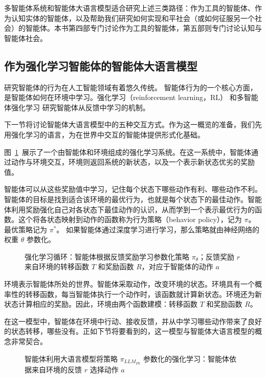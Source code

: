 多智能体系统和智能体大语言模型适合研究上述三类路径：作为工具的智能体、作为认知实体的智能体，以及帮助我们研究如何实现和平社会（或如何征服另一个社会）的智能体。本书第四部专门讨论作为工具的智能体，第五部则专门讨论认知与智能体社会。

\subsection{作为强化学习智能体的智能体大语言模型}
研究智能体的行为在人工智能领域有着悠久传统。
智能体行为的一个核心方面，是智能体如何在环境中学习。强化学习（reinforcement learning，RL）\citep{sutton2018reinforcement} 和多智能体强化学习 \citep{wong2021multiagent} 研究智能体从反馈中学习的机制。

下一节将讨论智能体大语言模型中的五种交互方式。作为这一概览的准备，我们先用强化学习的语言，为在世界中交互的智能体提供形式化基础。




图~\ref{fig:rl}~展示了一个由智能体和环境组成的强化学习系统。在这一系统中，智能体通过动作与环境交互，环境则返回系统的新状态，以及一个表示新状态优劣的奖励值。

智能体可以从这些奖励值中学习，记住每个状态下哪些动作有利、哪些动作不利。智能体的目标是找到适合该环境的最优行为，也就是每个状态下的最佳动作。智能体利用奖励强化自己对各状态下最佳动作的认识，从而学到一个表示最优行为的函数。这个将各状态映射到动作的函数称为行为策略（behavior policy），记为 $\pi$。最优策略记为 $\pi^*$。
如果智能体通过深度学习进行学习，那么策略就由神经网络的权重 $\theta$ 参数化。

\begin{figure}
  \begin{center}
    
    \caption{强化学习循环：智能体根据反馈奖励学习参数化策略 $\pi_\theta$；反馈奖励 $r$ 来自环境的转移函数 $T$ 和奖励函数 $R$，对应于智能体的动作 $a$ \citep{sutton2018reinforcement}}\label{fig:rl}
  \end{center}
\end{figure}

环境表示智能体所处的世界。智能体采取动作，改变环境的状态。环境具有一个概率性的转移函数，每当智能体执行一个动作时，该函数就计算新状态。环境还为新状态计算相应的奖励。因此，环境由两个函数建模：转移函数 $T$ 和奖励函数 $R$。

在这一模型中，智能体在环境中行动、接收反馈，并从中学习哪些动作带来了良好的状态转移，哪些没有。正如下节将要看到的，这一模型与智能体大语言模型的概念非常契合。


\begin{figure}
  \begin{center}
    
    \caption{智能体利用大语言模型将策略 $\pi_{LLM_{P\pi}}$ 参数化的强化学习：智能体依据来自环境的反馈 $r$ 选择动作 $a$}\label{fig:rl-llm}
  \end{center}
\end{figure}

